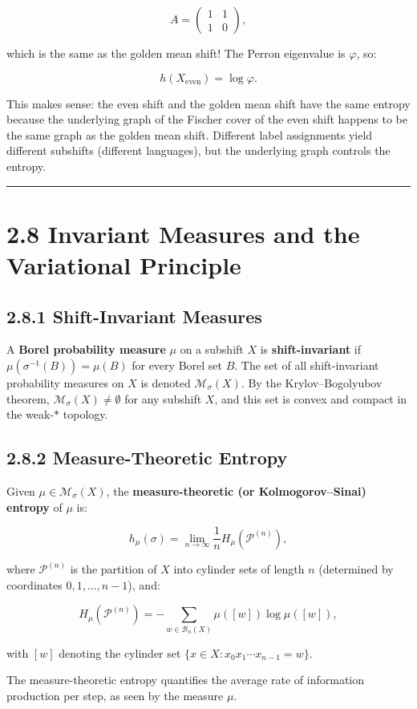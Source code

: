 \begin{example}
\[
A = \begin{pmatrix} 1 & 1 \\ 1 & 0 \end{pmatrix},
\]

which is the same as the golden mean shift! The Perron eigenvalue is $\varphi$, so:

\[
h(X_{\text{even}}) = \log \varphi.
\]

This makes sense: the even shift and the golden mean shift have the same entropy because the underlying graph of the Fischer cover of the even shift happens to be the same graph as the golden mean shift. Different label assignments yield different subshifts (different languages), but the underlying graph controls the entropy.

\bigskip\hrule\bigskip
\end{example}

\section{2.8 Invariant Measures and the Variational Principle}

\subsection{2.8.1 Shift-Invariant Measures}

A \textbf{Borel probability measure} $\mu$ on a subshift $X$ is \textbf{shift-invariant} if $\mu(\sigma^{-1}(B)) = \mu(B)$ for every Borel set $B$. The set of all shift-invariant probability measures on $X$ is denoted $\mathcal{M}_\sigma(X)$. By the Krylov--Bogolyubov theorem, $\mathcal{M}_\sigma(X) \neq \emptyset$ for any subshift $X$, and this set is convex and compact in the weak-$*$ topology.

\subsection{2.8.2 Measure-Theoretic Entropy}

\begin{definition}
Given $\mu \in \mathcal{M}_\sigma(X)$, the \textbf{measure-theoretic (or Kolmogorov--Sinai) entropy} of $\mu$ is:

\[
h_\mu(\sigma) = \lim_{n \to \infty} \frac{1}{n} H_\mu(\mathcal{P}^{(n)}),
\]

where $\mathcal{P}^{(n)}$ is the partition of $X$ into cylinder sets of length $n$ (determined by coordinates $0, 1, \ldots, n-1$), and:

\[
H_\mu(\mathcal{P}^{(n)}) = -\sum_{w \in \mathcal{B}_n(X)} \mu([w]) \log \mu([w]),
\]

with $[w]$ denoting the cylinder set $\{ x \in X : x_0 x_1 \cdots x_{n-1} = w\} $.

The measure-theoretic entropy quantifies the average rate of information production per step, as seen by the measure $\mu$.
\end{definition}

